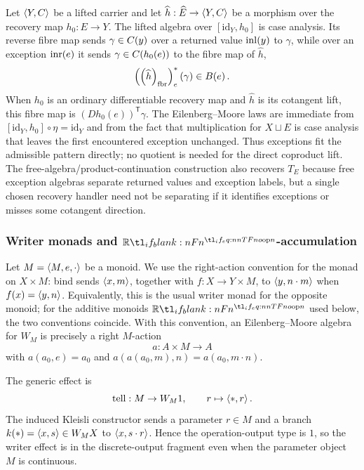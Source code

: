 \documentclass[11pt,a4paper]{article}
\theoremstyle{definition}
\theoremstyle{remark}
\providecommand{\id}{\mathrm{id}}
\providecommand{\fibr}[1]{\left(#1\right)_{\mathrm{fbr}}}
\begin{document}
Let \(\left\langle Y,C\right\rangle\) be a lifted carrier and let
\(\widehat h:\widehat E\to\left\langle Y,C\right\rangle\) be a morphism over the recovery map
\(h_0:E\to Y\).  The lifted algebra over \([\id_Y,h_0]\) is case analysis.  Its
reverse fibre map sends \(\gamma\in\Fun[np]{C}{y}\) over a returned value
\(\opn{inl}(y)\) to \(\gamma\), while over an exception \(\opn{inr}(e)\) it sends
\(\gamma\in\Fun[np]{C}{h_0(e)}\) to the fibre map of \(\widehat h\),
\[
  \left( \fibr{ \widehat{h} } \right)_e^{\ast}(\gamma)
  \in
  \Fun[np]{B}{e} .
\]
When \(h_0\) is an ordinary differentiable recovery map and \(\widehat h\) is
its cotangent lift, this fibre map is \((Dh_0(e))^{\mathsf T}\gamma\).  The
Eilenberg--Moore laws are immediate from
\([\id_Y,h_0]\circ\eta=\id_Y\) and from the fact that multiplication for
\(X\sqcup E\) is case analysis that leaves the first encountered exception
unchanged.  Thus exceptions fit the admissible pattern directly; no quotient is
needed for the direct coproduct lift.  The free-algebra/product-continuation
construction also recovers \(T_E\) because free exception algebras separate
returned values and exception labels, but a single chosen recovery handler need
not be separating if it identifies exceptions or misses some cotangent direction.

\subsubsection{Writer monads and \texorpdfstring{\(\R[n]\)}{R[n]}-accumulation}
\label{sec:appendix-writer-accumulation}

Let \(M=\left\langle M,e,\cdot\right\rangle\) be a monoid.  We use the right-action convention
for the monad on \(X\times M\): bind sends \(\left\langle x,m\right\rangle\), together
with \(f:X\to Y\times M\), to \(\left\langle y,n\cdot m\right\rangle\) when
\(\fn[n]{f}{x}=\tuple{y,n}\).  Equivalently, this is the usual writer monad
for the opposite monoid; for the additive monoids \(\R[n]\) used below, the two
conventions coincide.  With this convention, an Eilenberg--Moore algebra for
\(W_M\) is precisely a right \(M\)-action
\[
  a:A\times M\to A
\]
with \(a(a_0,e)=a_0\) and \(a(a(a_0,m),n)=a(a_0,m\cdot n)\).

The generic effect is
\[
  \opn{tell}:M\to W_M1,
  \qquad
  r\mapsto\tuple{\ast,r} .
\]
The induced Kleisli constructor sends a parameter \(r\in M\) and a branch
\(k(\ast)=\left\langle x,s\right\rangle\in W_MX\) to \(\left\langle x,s\cdot r\right\rangle\).  Hence the
operation-output type is \(1\), so the writer effect is in the discrete-output
fragment even when the parameter object \(M\) is continuous.
\end{document}

